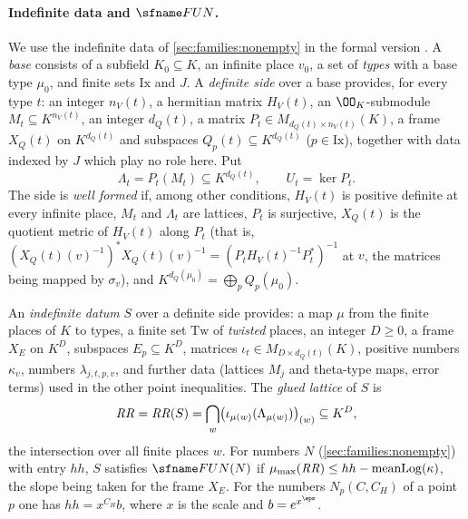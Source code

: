 \paragraph{Indefinite data and $\fitFUN$.}
We use the indefinite data of \cref{sec:families:nonempty} in the formal version \cite{LeanSource2026}. A \emph{base}
consists of a subfield $K_0\subseteq K$, an infinite place $v_0$, a set of \emph{types} with a base type $\mu_0$, and
finite sets $\mathrm{Ix}$ and $J$. A \emph{definite side} over a base provides, for every type $t$: an integer
$n_V(t)$, a hermitian matrix $H_V(t)$, an $\OO_K$-submodule $M_t\subseteq K^{n_V(t)}$, an integer $d_Q(t)$, a matrix
$P_t\in M_{d_Q(t)\times n_V(t)}(K)$, a frame $X_Q(t)$ on $K^{d_Q(t)}$ and subspaces $Q_p(t)\subseteq K^{d_Q(t)}$
($p\in\mathrm{Ix}$), together with data indexed by $J$ which play no role here. Put
\[
\Lambda_t=P_t(M_t)\subseteq K^{d_Q(t)},\qquad U_t=\ker P_t .
\]
The side is \emph{well formed} if, among other conditions, $H_V(t)$ is positive definite at every infinite place,
$M_t$ and $\Lambda_t$ are lattices, $P_t$ is surjective, $X_Q(t)$ is the quotient metric of $H_V(t)$ along $P_t$
(that is, $(X_Q(t)(v)^{-1})^*X_Q(t)(v)^{-1}=(P_tH_V(t)^{-1}P_t^*)^{-1}$ at $v$, the matrices being mapped by
$\sigma_v$), and $K^{d_Q(\mu_0)}=\bigoplus_pQ_p(\mu_0)$.

An \emph{indefinite datum} $S$ over a definite side provides: a map $\mu$ from the finite places of $K$ to types, a
finite set $\mathrm{Tw}$ of \emph{twisted} places, an integer $D\ge0$, a frame $X_E$ on $K^D$, subspaces
$E_p\subseteq K^D$, matrices $\iota_t\in M_{D\times d_Q(t)}(K)$, positive numbers $\kappa_v$, numbers
$\lambda_{j,t,p,v}$, and further data (lattices $M_j$ and theta-type maps, error terms) used in the other point
inequalities. The \emph{glued lattice} of $S$ is
\begin{equation}\label{eq:pf:fit:RR}
\mathit{RR}=\mathit{RR}(S)=\bigcap_w\bigl(\iota_{\mu(w)}(\Lambda_{\mu(w)})\bigr)_{(w)}\subseteq K^D,
\end{equation}
the intersection over all finite places $w$. For numbers $N$ (\cref{sec:families:nonempty}) with entry $hh$, $S$
satisfies $\fitFUN(N)$ if $\mu_{\max}(\mathit{RR})\le hh-\operatorname{meanLog}(\kappa)$, the slope being taken for the frame $X_E$. For the
numbers $N_p(C,C_H)$ of a point $p$ one has $hh=x^{C_H}b$, where $x$ is the scale and $b=e^{x^\eps}$.

